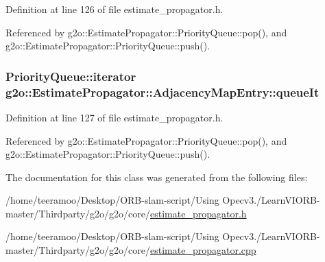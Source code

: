 Definition at line 126 of file estimate\+\_\+propagator.\+h.



Referenced by g2o\+::\+Estimate\+Propagator\+::\+Priority\+Queue\+::pop(), and g2o\+::\+Estimate\+Propagator\+::\+Priority\+Queue\+::push().

\subsubsection[{\texorpdfstring{queue\+It}{queueIt}}]{\setlength{\rightskip}{0pt plus 5cm}Priority\+Queue\+::iterator g2o\+::\+Estimate\+Propagator\+::\+Adjacency\+Map\+Entry\+::queue\+It\hspace{0.3cm}{\ttfamily [private]}}\hypertarget{classg2o_1_1EstimatePropagator_1_1AdjacencyMapEntry_a40828826b865378855fdc26fae46af11}{}\label{classg2o_1_1EstimatePropagator_1_1AdjacencyMapEntry_a40828826b865378855fdc26fae46af11}


Definition at line 127 of file estimate\+\_\+propagator.\+h.



Referenced by g2o\+::\+Estimate\+Propagator\+::\+Priority\+Queue\+::pop(), and g2o\+::\+Estimate\+Propagator\+::\+Priority\+Queue\+::push().



The documentation for this class was generated from the following files\+:\begin{DoxyCompactItemize}
\item 
/home/teeramoo/\+Desktop/\+O\+R\+B-\/slam-\/script/\+Using Opecv3./\+Learn\+V\+I\+O\+R\+B-\/master/\+Thirdparty/g2o/g2o/core/\hyperlink{estimate__propagator_8h}{estimate\+\_\+propagator.\+h}\item 
/home/teeramoo/\+Desktop/\+O\+R\+B-\/slam-\/script/\+Using Opecv3./\+Learn\+V\+I\+O\+R\+B-\/master/\+Thirdparty/g2o/g2o/core/\hyperlink{estimate__propagator_8cpp}{estimate\+\_\+propagator.\+cpp}\end{DoxyCompactItemize}

